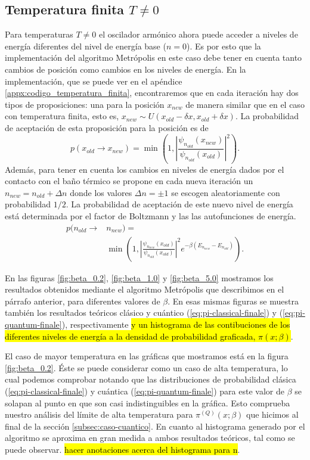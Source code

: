 \documentclass[%
 reprint,
 amsmath,amssymb,
 aps,
 pra,
]{revtex4-2}
\begin{document}
\subsection{Temperatura finita \texorpdfstring{$T \neq 0$}{T diferente de cero}\label{subsec:temperatura-finita}}
Para temperaturas $T\neq0$ el oscilador armónico ahora puede acceder a niveles de energía diferentes del nivel de energía base  ($n=0$). Es por esto que la implementación del algoritmo Metrópolis en este caso debe tener en cuenta tanto cambios de posición como cambios en los niveles de energía. En la implementación, que se puede ver en el apéndice \ref{appx:codigo_temperatura_finita}, encontraremos que en cada iteración hay dos tipos de proposiciones: una para la posición $x_{new}$ de manera similar que en el caso con temperatura finita, esto es, $x_{new} \sim U(x_{old} - \delta x, x_{old} + \delta x)$. La probabilidad de aceptación de esta proposición para la posición es de 
\begin{equation}
	p(x_{old} \rightarrow x_{new}) = \min\left(1,\left|\frac{\psi_{n_{old}}(x_{new})}{\psi_{n_{old}}(x_{old})}\right|^2\right).
\end{equation}
Además, para tener en cuenta los cambios en niveles de energía dados por el contacto con el baño térmico se propone en cada nueva iteración un $n_{new}=n_{old} + \Delta n$ donde los valores $\Delta n = \pm 1$ se escogen aleatoriamente con probabilidad $1/2$. La probabilidad de aceptación de este nuevo nivel de energía está determinada por el factor de Boltzmann y las las autofunciones de energía.
\begin{align}
	p(n_{old} \rightarrow 	& n_{new}) = \nonumber \\
							& \min\left(1,\left|\frac{\psi_{n_{new}}(x_{old})}{\psi_{n_{old}}(x_{old})}\right|^2 e^{-\beta\left(E_{n_{new}}-E_{n_{old}}\right)}\right).
\end{align}

En las figuras \ref{fig:beta_0.2}, \ref{fig:beta_1.0} y \ref{fig:beta_5.0} mostramos los resultados obtenidos mediante el algoritmo Metrópolis que describimos en el párrafo anterior, para diferentes valores de $\beta$. En esas mismas figuras se muestra también los resultados teóricos clásico y cuántico (\ref{eq:pi-classical-finale}) y (\ref{eq:pi-quantum-finale}), respectivamente \hl{y un histograma de las contibuciones de los diferentes niveles de energía a la densidad de probabilidad graficada, $\pi(x;\beta)$}.

El caso de mayor temperatura en las gráficas que mostramos está en la figura \ref{fig:beta_0.2}. Éste se puede considerar como un caso de alta temperatura, lo cual podemos comprobar notando que las distribuciones de probabilidad clásica (\ref{eq:pi-classical-finale}) y cuántica (\ref{eq:pi-quantum-finale}) para este valor de $\beta$ se solapan al punto en que son casi indistinguibles en la gráfica. Esto comprueba nuestro análisis del límite de alta temperatura para $\pi^{(Q)}(x;\beta)$ que hicimos al final de la sección \ref{subsec:caso-cuantico}. En cuanto al histograma generado por el algoritmo se aproxima en gran medida a ambos resultados teóricos, tal como se puede observar. \hl{hacer anotaciones acerca del histograma para n}.
\end{document}
